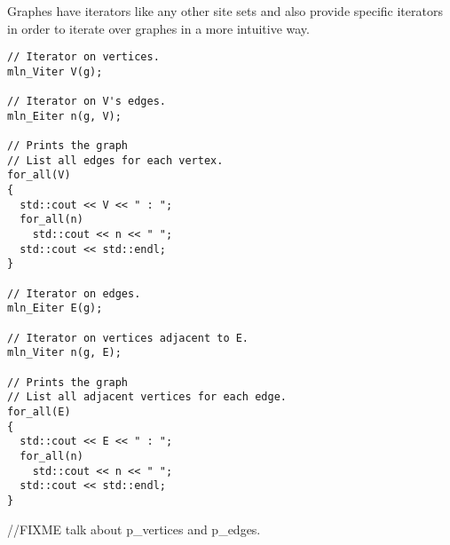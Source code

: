 \documentclass{report}
\begin{document}
Graphes have iterators like any other site sets and also provide
specific iterators in order to iterate over graphes in a more intuitive way.

\begin{lstlisting}
// Iterator on vertices.
mln_Viter V(g);

// Iterator on V's edges.
mln_Eiter n(g, V);

// Prints the graph
// List all edges for each vertex.
for_all(V)
{
  std::cout << V << " : ";
  for_all(n)
    std::cout << n << " ";
  std::cout << std::endl;
}

// Iterator on edges.
mln_Eiter E(g);

// Iterator on vertices adjacent to E.
mln_Viter n(g, E);

// Prints the graph
// List all adjacent vertices for each edge.
for_all(E)
{
  std::cout << E << " : ";
  for_all(n)
    std::cout << n << " ";
  std::cout << std::endl;
}
\end{lstlisting}

//FIXME talk about p\_vertices and p\_edges.
\end{document}
